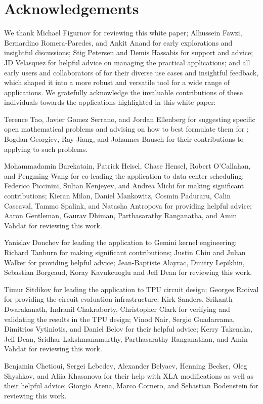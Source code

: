 \section*{Acknowledgements}
\label{sec:acknowledgements}

We thank  Michael Figurnov for reviewing this white paper; Alhussein Fawzi, Bernardino Romera-Paredes, and Ankit Anand for early explorations and insightful discussions; Stig Petersen and Demis Hassabis for support and advice;  JD Velasquez for helpful advice on managing the practical applications; and all early users and collaborators of \method for their diverse use cases and insightful feedback, which shaped it into a more robust and versatile tool for a wide range of applications. We gratefully acknowledge the invaluable contributions of these individuals towards the applications highlighted in this white paper:

Terence Tao, Javier Gomez Serrano, and Jordan Ellenberg for suggesting specific open mathematical problems and advising on how to best formulate them for \method; Bogdan Georgiev, Ray Jiang, and Johannes Bausch for their contributions to applying \method to such problems.

Mohammadamin Barekatain, Patrick Heisel, Chase Hensel, Robert O'Callahan, and Pengming Wang for co-leading the application to data center scheduling; Federico Piccinini, Sultan Kenjeyev, and Andrea Michi for making significant contributions; Kieran Milan, Daniel Mankowitz, Cosmin Paduraru, Calin Cascaval, Tammo Spalink, and Natasha Antropova for providing helpful advice; Aaron Gentleman, Gaurav Dhiman, Parthasarathy Ranganatha, and Amin Vahdat for reviewing this work.

Yanislav Donchev for leading the application to Gemini kernel engineering; Richard Tanburn for making significant contributions; Justin Chiu and Julian Walker for providing helpful advice; Jean-Baptiste Alayrac, Dmitry Lepikhin, Sebastian Borgeaud, Koray Kavukcuoglu and Jeff Dean for reviewing this work.

Timur Sitdikov for leading the application to TPU circuit design; Georges Rotival for providing the circuit evaluation infrastructure; Kirk Sanders, Srikanth Dwarakanath, Indranil Chakraborty, Christopher Clark for verifying and validating the results in the TPU design; Vinod Nair, Sergio Guadarrama, Dimitrios Vytiniotis, and Daniel Belov for their helpful advice; Kerry Takenaka, Jeff Dean, Sridhar Lakshmanamurthy, Parthasarathy Ranganathan, and Amin Vahdat for reviewing this work.

Benjamin Chetioui, Sergei Lebedev, Alexander Belyaev, Henning Becker, Oleg Shyshkov, and Aliia Khasanova for their help with XLA modifications as well as their helpful advice; Giorgio Arena, Marco Cornero, and Sebastian Bodenstein for reviewing this work.

